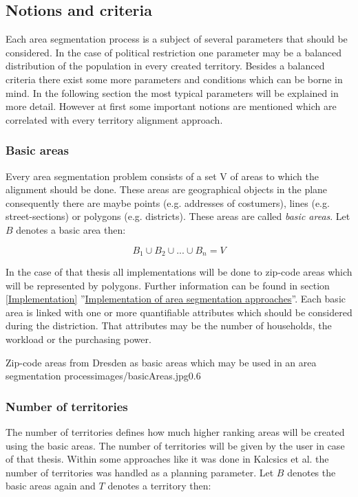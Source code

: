 \subsection{Notions and criteria}\label{notions}
Each area segmentation process is a subject of several parameters that should be considered. In the case of political restriction one parameter may be a balanced distribution of the population in every created territory. Besides a balanced criteria there exist some more parameters and conditions which can be borne in mind. In the following section the most typical parameters will be explained in more detail. However at first some important notions are mentioned which are correlated with every territory alignment approach.

\subsubsection{Basic areas}
Every area segmentation problem consists of a set V of areas to which the alignment should be done. These areas are geographical objects in the plane consequently there are maybe points (e.g. addresses of costumers), lines (e.g. street-sections) or polygons (e.g. districts). These areas are called \textit{basic areas}. Let $ B $ denotes a basic area then:

\[ \mathit{B_{1} \cup B_{2} \cup ... \cup B_{n}=V} \]

In the case of that thesis all implementations will be done to zip-code areas which will be represented by polygons. Further information can be found in section \ref{Implementation} ''\hyperref[Implementation]{Implementation of area segmentation approaches}''. Each basic area is linked with one or more quantifiable attributes which should be considered during the distriction. That attributes may be the number of households, the workload or the purchasing power.

\begin{figurevarSize}{Zip-code areas from Dresden as basic areas which may be used in an area segmentation process}{images/basicAreas.jpg}{0.6}\end{figurevarSize}

\subsubsection{Number of territories}
The number of territories defines how much higher ranking areas will be created using the basic areas. The number of territories will be given by the user in case of that thesis. Within some approaches like it was done in Kalcsics et al. \cite{kalcsics} the number of territories was handled as a planning parameter. Let $ B $ denotes the basic areas again and $ T $ denotes a territory then:

